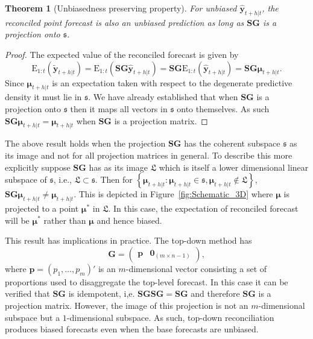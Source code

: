 \documentclass[12pt]{article}
\def\E{\text{E}}
\newtheorem{theo}{Theorem}[section]
\theoremstyle{definition}
\begin{document}
\begin{theo}[Unbiasedness preserving property]
  For unbiased $\hat{\bm{y}}_{t+h|t}$, the reconciled point forecast is also an unbiased prediction as long as $\bm{S}\bm{G}$ is a projection onto $\mathfrak{s}$.
\end{theo}
\begin{proof}
  The expected value of the reconciled forecast is given by
  \[
    \E_{1:t}(\tilde{\bm{y}}_{t+h|t})
      = \E_{1:t}(\bm{S}\bm{G}\hat{\bm{y}}_{t+h|t})
      = \bm{S}\bm{G}\E_{1:t}(\hat{\bm{y}}_{t+h|t})
      = \bm{S}\bm{G}\bm{\mu}_{t+h|t}.
  \]
  Since $\bm{\mu}_{t+h|t}$ is an expectation taken with respect to the degenerate predictive density it must lie in $\mathfrak{s}$. We have already established that when $\bm{S}\bm{G}$ is a projection onto $\mathfrak{s}$ then it maps all vectors in $\mathfrak{s}$ onto themselves. As such $\bm{S}\bm{G}\bm{\mu}_{t+h|t}=\bm{\mu}_{t+h|t}$ when $\bm{S}\bm{G}$ is a projection matrix.
\end{proof}

The above result holds when the projection $\bm{S}\bm{G}$ has the coherent subspace $\mathfrak{s}$ as its image and not for all projection matrices in general. To describe this more explicitly suppose $\bm{S}\bm{G}$ has as its image $\mathfrak{L}$ which is itself a lower dimensional linear subspace of $\mathfrak{s}$, {\color{blue}i.e.,} $\mathfrak{L}\subset\mathfrak{s}$. Then for $\left\{\bm{\mu}_{t+h|t}:\bm{\mu}_{t+h|t}\in\mathfrak{s},\bm{\mu}_{t+h|t}\notin\mathfrak{L}\right\}$, $\bm{S}\bm{G}\bm{\mu}_{t+h|t} \ne \bm{\mu}_{t+h|t}$. This is depicted in Figure~\ref{fig:Schematic_3D} where $\bm{\mu}$ is projected to a point ${\bm{\mu}^*}$ in $\mathfrak{L}$. In this case, the expectation of reconciled forecast will be ${\bm{\mu}^*}$ rather than $\bm{\mu}$ and hence biased.

This result has implications in practice. The top-down method \citep{Gross1990} has
\begin{equation*}
  \bm{G} = \begin{pmatrix}
             \bm{p} & \bm{0}_{(m \times n-1)}
           \end{pmatrix},
\end{equation*}
where $\bm{p} = (p_1,\dots,p_m)'$ is an $m$-dimensional vector consisting a set of proportions used to disaggregate the top-level forecast. In this case it can be verified that $\bm{S}\bm{G}$ is idempotent, i,e. $\bm{S}\bm{G}\bm{S}\bm{G}=\bm{S}\bm{G}$ and therefore $\bm{S}\bm{G}$ is a projection matrix. However, the image of this projection is not an $m$-dimensional subspace but a $1$-dimensional subspace. As such, top-down reconciliation produces biased forecasts even when the base forecasts are unbiased.
\end{document}
